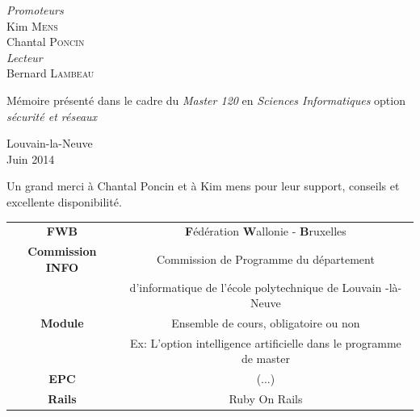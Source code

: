 \documentclass[11pt,a4paper,twoside]{book}
\begin{document}
\begin{titlepage}
\begin{center}
\begin{minipage}{0.4\textwidth}
\begin{flushleft} \large
\emph{Promoteurs}\\Kim \textsc{Mens}\\
Chantal \textsc{Poncin}\\
\emph{Lecteur}\\Bernard \textsc{Lambeau}\\
\end{flushleft}
\end{minipage}
\begin{minipage}{0.4\textwidth}
\begin{flushright} \large
Mémoire présenté dans le cadre du \emph{Master 120} en \emph{Sciences Informatiques} option \emph{sécurité et réseaux}
\end{flushright}
\end{minipage}
\vfill
Louvain-la-Neuve\\
{\large Juin 2014}
\end{center}
\end{titlepage}
\newpage
\vspace*{\fill}
\begin{center}
\begin{minipage}{0.4\textwidth}
\begin{flushright} \large
Un grand merci à Chantal Poncin et à Kim mens pour leur support, conseils et excellente disponibilité.
\end{flushright}
\end{minipage}
\end{center}
\vspace*{\fill}

\tableofcontents
%

\clearpage
{} 

\begin{longtable}{c c}

\textbf{FWB} & \textbf{F}édération \textbf{W}allonie - \textbf{B}ruxelles\\
\textbf{Commission INFO} & Commission de Programme du département\\ 
&d'informatique de l'école polytechnique de Louvain -là-Neuve\\
\textbf{Module} & Ensemble de cours, obligatoire ou non\\
& Ex: L'option intelligence artificielle dans le programme de master\\
\textbf{EPC} & (...)\\
\textbf{Rails} & Ruby On Rails\\
\end{longtable}
\end{document}
